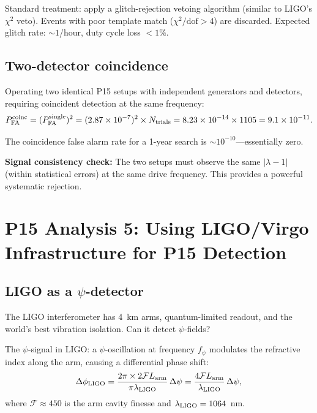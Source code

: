 \documentclass[11pt]{article}
\newcommand{\ee}[1]{\times 10^{#1}}
\newcommand{\lam}{\lambda}
\begin{document}
Standard treatment: apply a glitch-rejection vetoing algorithm
(similar to LIGO's $\chi^2$ veto). Events with poor template match
($\chi^2/\text{dof} > 4$) are discarded. Expected glitch rate:
$\sim 1$/hour, duty cycle loss $< 1\%$.

\subsection{Two-detector coincidence}

Operating two identical P15 setups with independent generators
and detectors, requiring coincident detection at the same frequency:
\begin{equation}
P_{\rm FA}^{\rm coinc} = (P_{\rm FA}^{\rm single})^2
= (2.87\ee{-7})^2 \times N_{\rm trials} = 8.23\ee{-14}
\times 1105 = 9.1\ee{-11}.
\end{equation}

The coincidence false alarm rate for a 1-year search is
$\sim 10^{-10}$---essentially zero.

\textbf{Signal consistency check:} The two setups must observe
the same $|\lam-1|$ (within statistical errors) at the same
drive frequency. This provides a powerful systematic rejection.

\section{P15 Analysis 5: Using LIGO/Virgo Infrastructure for P15 Detection}
\label{sec:ligo}

\subsection{LIGO as a $\psi$-detector}

The LIGO interferometer has 4~km arms, quantum-limited readout,
and the world's best vibration isolation. Can it detect $\psi$-fields?

The $\psi$-signal in LIGO: a $\psi$-oscillation at frequency
$f_\psi$ modulates the refractive index along the arm, causing
a differential phase shift:
\begin{equation}
\Delta\phi_{\rm LIGO} = \frac{2\pi \times 2\mathcal{F}L_{\rm arm}}
{\pi\lambda_{\rm LIGO}}\,\Delta\psi
= \frac{4\mathcal{F}L_{\rm arm}}{\lambda_{\rm LIGO}}\,\Delta\psi,
\end{equation}
where $\mathcal{F} \approx 450$ is the arm cavity finesse and
$\lambda_{\rm LIGO} = 1064$~nm.
\end{document}
